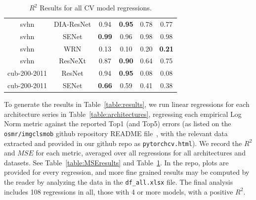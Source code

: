 \begin{table}[t]
\begin{center}
\begin{tabular}{|c|c|c|c|c|c|}
 svhn & DIA-ResNet  & 0.94 &  \textbf{0.95} & 0.78 & 0.77 \\
 svhn & SENet  & \textbf{0.99} &  0.96 & 0.98 & 0.98 \\
 svhn & WRN  & 0.13 &  0.10 & 0.20 & \textbf{0.21} \\
 svhn & ResNeXt  & 0.87 &  \textbf{0.90} & 0.64 & 0.75 \\
\hline
 cub-200-2011 & ResNet  & 0.94 &  \textbf{0.95} & 0.08 & 0.08 \\
 cub-200-2011 & SENet  & \textbf{0.66} &  0.59 & 0.41 & 0.38 \\
\hline
\end{tabular}
\end{center}
\vspace{-5mm}
\caption{$R^{2}$ Results for all CV model regressions. }
\label{table:R2results}
\end{table}

To generate the results in Table~\ref{table:results}, we run linear regressions for each architecture series in Table~\ref{table:architectures}, regressing each empirical Log Norm metric against the reported Top1 (and Top5) errors (as listed on the \texttt{osmr/imgclsmob} github repository README file~\cite{osmr}, with the relevant data extracted and provided in our github repo as \texttt{pytorchcv.html}).
We record the $R^{2}$ and $MSE$ for each metric, averaged over all regressions for all architectures and datasets.
See Table~\ref{table:MSEresults} and Table~\ref{table:R2results}.
In the repo, plots are provided for every regression, and more fine grained results may be computed by the reader by analyzing the data in the \texttt{df\_all.xlsx} file.
The final analysis includes 108 regressions in all, those with 4 or more models, with a positive $R^2$.


